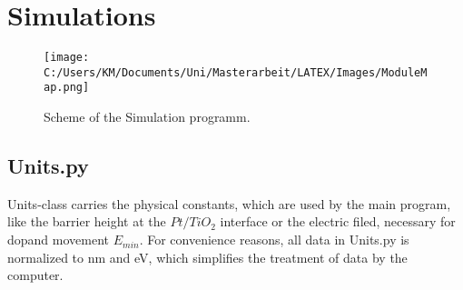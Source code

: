 \documentclass[12pt]{article}
\begin{document}
\section{Simulations}
	\label{sec:Simulations}

\begin{figure}[H]
	\centering
		\texttt{[image: C:/Users/KM/Documents/Uni/Masterarbeit/LATEX/Images/ModuleMap.png]}
	\caption{Scheme of the Simulation programm.}
	\label{fig:ModuleMap}
\end{figure}

\subsection{Units.py}
	Units-class carries the physical constants, which are used by the main program, like the barrier height at the $Pt/TiO_2$ interface or the electric filed, necessary for dopand movement $E_{min}$. For convenience reasons, all data in Units.py is normalized to nm and eV, which simplifies the treatment of data by the computer.
\end{document}
